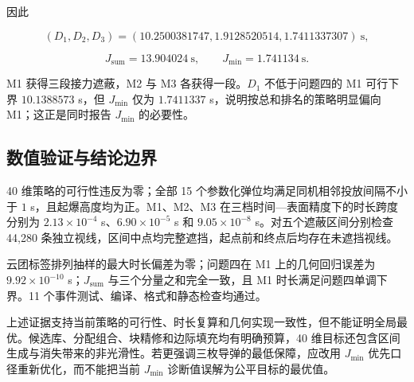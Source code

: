 \begin{center}
\small
\setlength{\tabcolsep}{3pt}
\renewcommand{\arraystretch}{1.18}
\end{center}

因此

\[
(D_1,D_2,D_3)
=(10.2500381747,1.9128520514,1.7411337307)\ \mathrm s,
\]

\[
\boxed{J_{\mathrm{sum}}=13.904024\ \mathrm s},
\qquad
\boxed{J_{\min}=1.741134\ \mathrm s}.
\]

M1 获得三段接力遮蔽，M2 与 M3 各获得一段。$D_1$ 不低于问题四的 M1 可行下界 $10.1388573$ s，但 $J_{\min}$ 仅为 $1.7411337$ s，说明按总和排名的策略明显偏向 M1；这正是同时报告 $J_{\min}$ 的必要性。

\subsection{数值验证与结论边界}

40 维策略的可行性违反为零；全部 15 个参数化弹位均满足同机相邻投放间隔不小于 $1$ s，且起爆高度均为正。M1、M2、M3 在三档时间—表面精度下的时长跨度分别为 $2.13\times10^{-4}$ s、$6.90\times10^{-5}$ s 和 $9.05\times10^{-8}$ s。对五个遮蔽区间分别检查 44,280 条独立视线，区间中点均完整遮挡，起点前和终点后均存在未遮挡视线。

云团标签排列抽样的最大时长偏差为零；问题四在 M1 上的几何回归误差为 $9.92\times10^{-10}$ s；$J_{\mathrm{sum}}$ 与三个分量之和完全一致，且 M1 时长满足问题四单调下界。11 个事件测试、编译、格式和静态检查均通过。

上述证据支持当前策略的可行性、时长复算和几何实现一致性，但不能证明全局最优。候选库、分配组合、块精修和边际填充均有明确预算，40 维目标还包含区间生成与消失带来的非光滑性。若更强调三枚导弹的最低保障，应改用 $J_{\min}$ 优先口径重新优化，而不能把当前 $J_{\min}$ 诊断值误解为公平目标的最优值。

